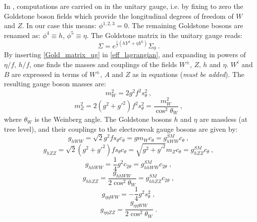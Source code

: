 In \cite{Cacciapaglia:2014uja}, computations are carried on in the unitary gauge, i.e. by fixing to zero the Goldstone boson fields which provide the longitudinal degrees of freedom of $W$ and $Z$. In our case this means: $\phi^{1,2,3} = 0$. The remaining Goldstone bosons are renamed as: $\phi^4 \equiv h$, $\phi^5 \equiv \eta$. The Goldstone matrix in the unitary gauge reads:
\begin{equation}
\Sigma = e^{\frac{i}{f} (h Y^4 + \eta Y^5)} \Sigma_0 \: .
\label{Gold_matrix_ug}
\end{equation}
%
By inserting \ref{Gold_matrix_ug} in \ref{eff_lagrangian}, and expanding in powers of $\eta/f$, $h/f$, one finds the masses and couplings of the fields $W^{\pm}$, $Z$, $h$ and $\eta$. $W^i$ and $B$ are expressed in terms of $W^{\pm}$, $A$ and $Z$ as in equations (\emph{\color{red}must be added}). The resulting gauge boson masses are:
\begin{equation}
m^2_{W} = 2 g^2 f^2 s_{\theta}^2 \: ,
\end{equation}
\begin{equation}
m^2_Z = 2 (g^2 + {g'}^2) f^2 s_{\theta}^2 = \frac{m_W^2}{\cos^2\theta_W} \: ,
\end{equation}
%
where $\theta_W$ is the Weinberg angle. The Goldstone bosons $h$ and $\eta$ are massless (at tree level), and their couplings to the electroweak gauge bosons are given by:
\begin{equation}
g_{hWW} = \sqrt 2 g^2 f s_{\theta} c_{\theta} = g m_W c_{\theta} = g^{SM}_{hWW} c_{\theta} \: ,
\end{equation}
\begin{equation}
g_{hZZ} = \sqrt 2 (g^2 + {g'}^2) f s_{\theta} c_{\theta} = \sqrt{g^2 + {g'}^2} m_Z c_{\theta} = g^{SM}_{hZZ} c_{\theta} \: ,
\end{equation}
\begin{equation}
g_{hhWW} = \frac{1}{4} g^2 c_{2 \theta} = g_{hhWW}^{SM} c_{2 \theta} \; ,
\end{equation}
\begin{equation}
g_{hhZZ} = \frac{g_{hhWW}}{2 \cos^2 \theta_W}  = g_{hhZZ}^{SM} c_{2 \theta} \; ,
\end{equation}
\begin{equation}
g_{\eta \eta WW} = - \frac{1}{4} g^2 s_{\theta}^2 \; ,
\end{equation} 
\begin{equation}
g_{\eta \eta ZZ} = \frac{g_{\eta \eta WW}}{2 \cos^2 \theta_W}  \; .
\end{equation}
%
